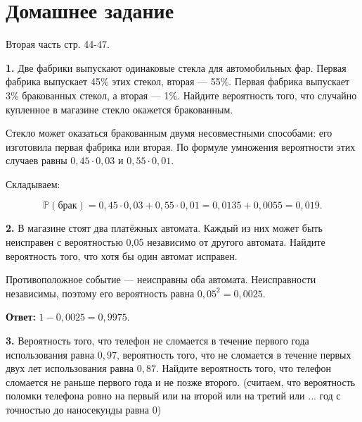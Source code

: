 \section{Домашнее задание}

Вторая часть стр. 44-47.

\begin{task}\label{task-homework-1}
\textbf{1.} Две фабрики выпускают одинаковые стекла для автомобильных фар. Первая фабрика выпускает 45\% этих стекол, вторая  —  55\%. Первая фабрика выпускает 3\% бракованных стекол, а вторая  —  1\%. Найдите вероятность того, что случайно купленное в магазине стекло окажется бракованным.
\end{task}

\begin{solution}\label{solution-independent-events-homework-1}
Стекло может оказаться бракованным двумя несовместными способами: его изготовила первая фабрика или вторая. По формуле умножения вероятности этих случаев равны $0,45\cdot0,03$ и $0,55\cdot0,01$.

Складываем:

\[\mathbb P(\text{брак})=0,45\cdot0,03+0,55\cdot0,01=0,0135+0,0055=0,019.\]
\end{solution}

\begin{task}\label{task-homework-2}
\textbf{2.} В магазине стоят два платёжных автомата. Каждый из них может быть неисправен с вероятностью 0,05 независимо от другого автомата. Найдите вероятность того, что хотя бы один автомат исправен.
\end{task}

\begin{solution}\label{solution-independent-events-homework-2}
Противоположное событие — неисправны оба автомата. Неисправности независимы, поэтому его вероятность равна $0,05^2=0,0025$.

\textbf{Ответ:} $1-0,0025=0,9975$.
\end{solution}

\begin{task}\label{task-homework-3}
\textbf{3.} Вероятность того, что телефон не сломается в течение первого года использования равна $0,97$, вероятность того, что не сломается в течение первых двух лет использования равна $0,87$. Найдите вероятность того, что телефон сломается не раньше первого года и не позже второго. (считаем, что вероятность поломки телефона ровно на первый или на второй или на третий или ... год с точностью до наносекунды равна 0)
\end{task}

